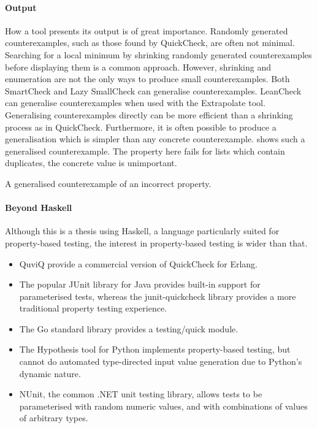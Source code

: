 \paragraph{Output}
How a tool presents its output is of great importance.  Randomly
generated counterexamples, such as those found by
QuickCheck\cite{claessen2000}, are often not minimal.  Searching for a
local minimum by shrinking randomly generated counterexamples before
displaying them is a common approach.  However, shrinking and
enumeration are not the only ways to produce small counterexamples.
Both SmartCheck\cite{pike2014} and Lazy SmallCheck\cite{runciman2008}
can generalise counter\-examples.  LeanCheck\cite{braquehais2017lean}
can generalise counterexamples when used with the
Extrapolate\cite{braquehais2017ifl} tool.  Generalising
counterexamples directly can be more efficient than a shrinking
process as in QuickCheck\cite{pike2014}.  Furthermore, it is often
possible to produce a generalisation which is simpler than any
concrete counterexample.   shows such a generalised
counterexample.  The property here fails for lists which contain
duplicates, the concrete value is unimportant.

\begin{listing}
\centering
{}
\caption{A generalised counterexample of an incorrect property.}\label{lst:gencntr}
\end{listing}

\paragraph{Beyond Haskell}
Although this is a thesis using Haskell, a language particularly
suited for property-based testing, the interest in property-based
testing is wider than that.

\begin{itemize}
\item QuviQ provide a commercial version of QuickCheck for
  Erlang\cite{arts2006}.
\item The popular JUnit library for Java provides built-in support for
  parameterised tests\cite{junit2017}, whereas the
  junit-quickcheck\cite{holser2018} library provides a more
  traditional property testing experience.
\item The Go standard library provides a
  testing/quick\cite{golang2017tq} module.
\item The Hypothesis\cite{hypothesis2018} tool for Python implements
  property-based testing, but cannot do automated type-directed input
  value generation due to Python's dynamic nature.
\item NUnit, the common .NET unit testing library, allows tests to be
  parameterised with random numeric values\cite{nunit2017ra}, and with
  combinations of values of arbitrary types\cite{nunit2017va}.
\end{itemize}

